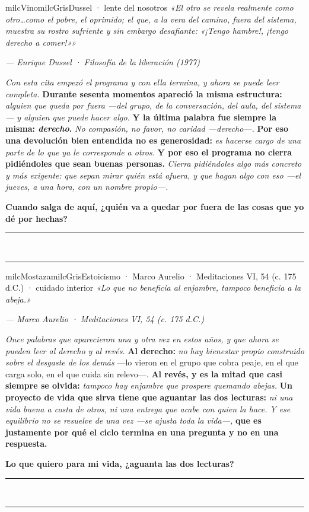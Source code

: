 \documentclass[11pt,letterpaper]{article}
\newcommand{\linead}[1]{\noindent\color{milcLinea}\rule{#1}{0.5pt}\color{milcNegro}}
\begin{document}
\begin{softbox}{milcVino}{milcGris}{Dussel · lente del nosotros}
\textit{«El otro se revela realmente como otro\ldots como el pobre, el oprimido; el que, a la vera del camino, fuera del sistema, muestra su rostro sufriente y sin embargo desafiante: «¡Tengo hambre!, ¡tengo derecho a comer!»»}

{\footnotesize\itshape\color{milcNegro!70}--- Enrique Dussel · Filosofía de la liberación (1977)}

\emph{Con esta cita empezó el programa y con ella termina, y ahora se puede leer completa.} \textbf{Durante sesenta momentos apareció la misma estructura:} \emph{alguien que queda por fuera ---del grupo, de la conversación, del aula, del sistema--- y alguien que puede hacer algo.} \textbf{Y la última palabra fue siempre la misma: \emph{derecho}.} \emph{No compasión, no favor, no caridad ---derecho---.} \textbf{Por eso una devolución bien entendida no es generosidad:} \emph{es hacerse cargo de una parte de lo que ya le corresponde a otros.} \textbf{Y por eso el programa no cierra pidiéndoles que sean buenas personas.} \emph{Cierra pidiéndoles algo más concreto y más exigente: que sepan mirar quién está afuera, y que hagan algo con eso ---el jueves, a una hora, con un nombre propio---.}

\textbf{Cuando salga de aquí, ¿quién va a quedar por fuera de las cosas que yo dé por hechas?}
\end{softbox}
\linead{\linewidth}\\[1mm]
\linead{\linewidth}

\begin{softbox}{milcMostaza}{milcGris}{Estoicismo · Marco Aurelio · Meditaciones VI, 54 (c. 175 d.C.) · cuidado interior}
\textit{«Lo que no beneficia al enjambre, tampoco beneficia a la abeja.»}

{\footnotesize\itshape\color{milcNegro!70}--- Marco Aurelio · Meditaciones VI, 54 (c. 175 d.C.)}

\emph{Once palabras que aparecieron una y otra vez en estos años, y que ahora se pueden leer al derecho y al revés.} \textbf{Al derecho:} \emph{no hay bienestar propio construido sobre el desgaste de los demás} ---lo vieron en el grupo que cobra peaje, en el que carga solo, en el que cuida sin relevo---. \textbf{Al revés, y es la mitad que casi siempre se olvida:} \emph{tampoco hay enjambre que prospere quemando abejas.} \textbf{Un proyecto de vida que sirva tiene que aguantar las dos lecturas:} \emph{ni una vida buena a costa de otros, ni una entrega que acabe con quien la hace.} \emph{Y ese equilibrio no se resuelve de una vez ---se ajusta toda la vida---,} \textbf{que es justamente por qué el ciclo termina en una pregunta y no en una respuesta.}

\textbf{Lo que quiero para mi vida, ¿aguanta las dos lecturas?}
\end{softbox}
\linead{\linewidth}\\[1mm]
\linead{\linewidth}
\end{document}
